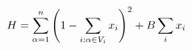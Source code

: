\documentclass[preview]{standalone}
\begin{document}
\begin{align*}
\special{dvisvgm:raw <g id='unique000'>}H=\sum_{\alpha=1}^{n} \special{dvisvgm:raw </g>}\special{dvisvgm:raw <g id='unique001'>}\left(1-\sum_{i:\alpha \in V_i} x_i\right)^2 \special{dvisvgm:raw </g>}\special{dvisvgm:raw <g id='unique002'>}+ B\sum_{i} x_i\special{dvisvgm:raw </g>}
\end{align*}
\end{document}
